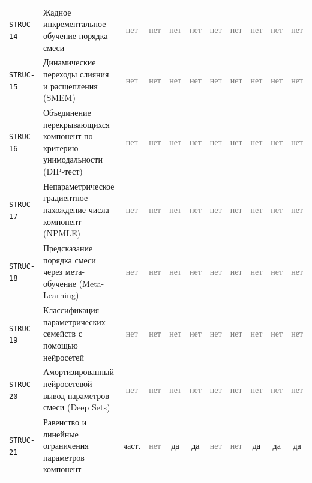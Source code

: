 \documentclass[10pt,a4paper]{article}
\begin{document}
\begin{landscape}
{\begin{longtable}{@{}l >{\raggedright\arraybackslash}p{8.0cm} *{9}{c}@{}}
\texttt{STRUC-14} & Жадное инкрементальное обучение порядка смеси & \textcolor{gray}{нет} & \textcolor{gray}{нет} & \textcolor{gray}{нет} & \textcolor{gray}{нет} & \textcolor{gray}{нет} & \textcolor{gray}{нет} & \textcolor{gray}{нет} & \textcolor{gray}{нет} & \textcolor{gray}{нет} \\
\texttt{STRUC-15} & Динамические переходы слияния и расщепления (SMEM) & \textcolor{gray}{нет} & \textcolor{gray}{нет} & \textcolor{gray}{нет} & \textcolor{gray}{нет} & \textcolor{gray}{нет} & \textcolor{gray}{нет} & \textcolor{gray}{нет} & \textcolor{gray}{нет} & \textcolor{gray}{нет} \\
\texttt{STRUC-16} & Объединение перекрывающихся компонент по критерию унимодальности (DIP-тест) & \textcolor{gray}{нет} & \textcolor{gray}{нет} & \textcolor{gray}{нет} & \textcolor{gray}{нет} & \textcolor{gray}{нет} & \textcolor{gray}{нет} & \textcolor{gray}{нет} & \textcolor{gray}{нет} & \textcolor{gray}{нет} \\
\texttt{STRUC-17} & Непараметрическое градиентное нахождение числа компонент (NPMLE) & \textcolor{gray}{нет} & \textcolor{gray}{нет} & \textcolor{gray}{нет} & \textcolor{gray}{нет} & \textcolor{gray}{нет} & \textcolor{gray}{нет} & \textcolor{gray}{нет} & \textcolor{gray}{нет} & \textcolor{gray}{нет} \\
\texttt{STRUC-18} & Предсказание порядка смеси через мета-обучение (Meta-Learning) & \textcolor{gray}{нет} & \textcolor{gray}{нет} & \textcolor{gray}{нет} & \textcolor{gray}{нет} & \textcolor{gray}{нет} & \textcolor{gray}{нет} & \textcolor{gray}{нет} & \textcolor{gray}{нет} & \textcolor{gray}{нет} \\
\texttt{STRUC-19} & Классификация параметрических семейств с помощью нейросетей & \textcolor{gray}{нет} & \textcolor{gray}{нет} & \textcolor{gray}{нет} & \textcolor{gray}{нет} & \textcolor{gray}{нет} & \textcolor{gray}{нет} & \textcolor{gray}{нет} & \textcolor{gray}{нет} & \textcolor{gray}{нет} \\
\texttt{STRUC-20} & Амортизированный нейросетевой вывод параметров смеси (Deep Sets) & \textcolor{gray}{нет} & \textcolor{gray}{нет} & \textcolor{gray}{нет} & \textcolor{gray}{нет} & \textcolor{gray}{нет} & \textcolor{gray}{нет} & \textcolor{gray}{нет} & \textcolor{gray}{нет} & \textcolor{gray}{нет} \\
\texttt{STRUC-21} & Равенство и линейные ограничения параметров компонент & \cellcolor{part!40}част. & \textcolor{gray}{нет} & \cellcolor{yes!30}да & \cellcolor{yes!30}да & \textcolor{gray}{нет} & \textcolor{gray}{нет} & \cellcolor{yes!30}да & \cellcolor{yes!30}да & \cellcolor{yes!30}да \\

\end{longtable}}
\end{landscape}
\end{document}
